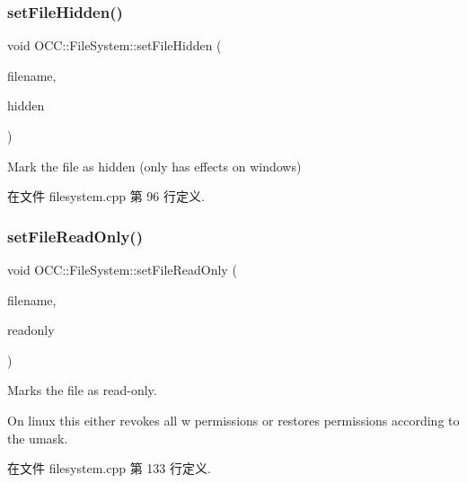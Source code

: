 \subsubsection{\texorpdfstring{set\+File\+Hidden()}{setFileHidden()}}
{\footnotesize\ttfamily void O\+C\+C\+::\+File\+System\+::set\+File\+Hidden (\begin{DoxyParamCaption}\item[{const Q\+String \&}]{filename,  }\item[{bool}]{hidden }\end{DoxyParamCaption})}



Mark the file as hidden (only has effects on windows) 



在文件 filesystem.\+cpp 第 96 行定义.

\mbox{\label{namespace_o_c_c_1_1_file_system_a875f747aa9ad5b52ab5270aab7d52d46}} 
\subsubsection{\texorpdfstring{set\+File\+Read\+Only()}{setFileReadOnly()}}
{\footnotesize\ttfamily void O\+C\+C\+::\+File\+System\+::set\+File\+Read\+Only (\begin{DoxyParamCaption}\item[{const Q\+String \&}]{filename,  }\item[{bool}]{readonly }\end{DoxyParamCaption})}



Marks the file as read-\/only. 

On linux this either revokes all \textquotesingle{}w\textquotesingle{} permissions or restores permissions according to the umask. 

在文件 filesystem.\+cpp 第 133 行定义.

\mbox{\label{namespace_o_c_c_1_1_file_system_a8be889e4d12b3e9d5e27f454e4c55a71}} 
